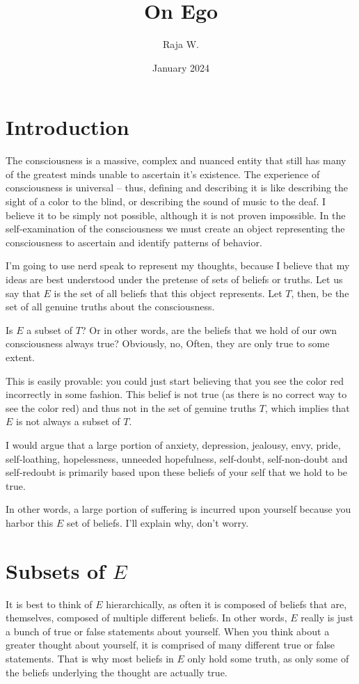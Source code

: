 \documentclass{article}
\begin{document}
\title{On Ego}
\date{January 2024}
\author{Raja W.}
\maketitle

\section{Introduction}
The consciousness is a massive, complex and nuanced entity that still has many
of the greatest minds unable to ascertain it's existence. The experience of
consciousness is universal -- thus, defining and describing it is like
describing the sight of a color to the blind, or describing the sound of music
to the deaf. I believe it to be simply not possible, although it is not proven
impossible. In the self-examination of the consciousness we must create an
object representing the consciousness to ascertain and identify patterns of
behavior.

I'm going to use nerd speak to represent my thoughts, because I believe that my
ideas are best understood under the pretense of sets of beliefs or truths. Let
us say that $E$ is the set of all beliefs that this object represents. Let $T$,
then, be the set of all genuine truths about the consciousness.

Is $E$ a subset of $T$? Or in other words, are the beliefs that we hold of our
own consciousness always true? Obviously, no, Often, they are only true to some
extent.

This is easily provable: you could just start believing that you see the color
red incorrectly in some fashion. This belief is not true (as there is no correct
way to see the color red) and thus not in the set of genuine truths $T$, which
implies that $E$ is not always a subset of $T$.

I would argue that a large portion of anxiety, depression, jealousy, envy,
pride, self-loathing, hopelessness, unneeded hopefulness, self-doubt,
self-non-doubt and self-redoubt is primarily based upon these beliefs of your 
self that we hold to be true.

In other words, a large portion of suffering is incurred upon yourself because
you harbor this $E$ set of beliefs. I'll explain why, don't worry.

\section{Subsets of $E$}
It is best to think of $E$ hierarchically, as often it is composed of beliefs
that are, themselves, composed of multiple different beliefs. In other words,
$E$ really is just a bunch of true or false statements about yourself. When you
think about a greater thought about yourself, it is comprised of many different
true or false statements. That is why most beliefs in $E$ only hold some truth,
as only some of the beliefs underlying the thought are actually true.
\end{document}
